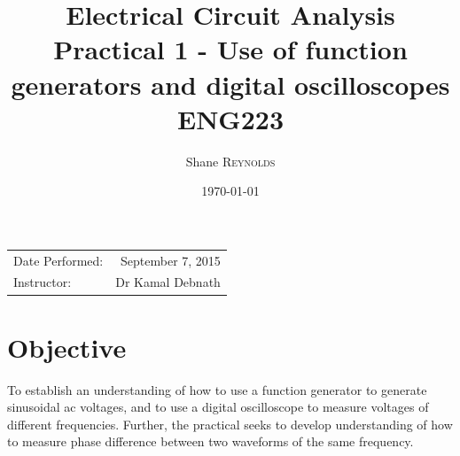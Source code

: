 \documentclass{article}
\title{Electrical Circuit Analysis \\ Practical 1 - Use of function generators and digital oscilloscopes \\ ENG223} %
\author{Shane \textsc{Reynolds}} %
\date{\today} %
\begin{document}
\maketitle %

\begin{center}
\begin{tabular}{l r}
Date Performed: & September 7, 2015 \\ %
Instructor: & Dr Kamal Debnath %
\end{tabular}
\end{center}



\section{Objective}

To establish an understanding of how to use a function generator to generate sinusoidal ac voltages, and to use a digital oscilloscope to measure voltages of different frequencies. Further, the practical seeks to develop understanding of how to measure phase difference between two waveforms of the same frequency.
\end{document}
